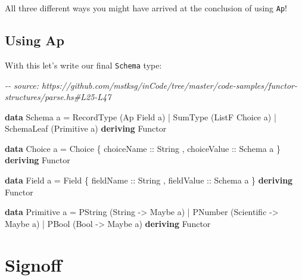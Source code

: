 \documentclass[]{article}
\newenvironment{Shaded}{}{}
\newcommand{\CommentTok}[1]{\textcolor[rgb]{0.38,0.63,0.69}{\textit{#1}}}
\newcommand{\DataTypeTok}[1]{\textcolor[rgb]{0.56,0.13,0.00}{#1}}
\newcommand{\KeywordTok}[1]{\textcolor[rgb]{0.00,0.44,0.13}{\textbf{#1}}}
\newcommand{\NormalTok}[1]{#1}
\newcommand{\OperatorTok}[1]{\textcolor[rgb]{0.40,0.40,0.40}{#1}}
\newcommand{\OtherTok}[1]{\textcolor[rgb]{0.00,0.44,0.13}{#1}}
\begin{document}
All three different ways you might have arrived at the conclusion of using
\texttt{Ap}!

\hypertarget{using-ap}{%
\subsection{Using Ap}\label{using-ap}}

With this let's write our final \texttt{Schema} type:

\begin{Shaded}
\begin{Highlighting}[]
\CommentTok{{-}{-} source: https://github.com/mstksg/inCode/tree/master/code{-}samples/functor{-}structures/parse.hs\#L25{-}L47}

\KeywordTok{data} \DataTypeTok{Schema}\NormalTok{ a }\OtherTok{=}
      \DataTypeTok{RecordType}\NormalTok{  (}\DataTypeTok{Ap} \DataTypeTok{Field}\NormalTok{ a)}
    \OperatorTok{|} \DataTypeTok{SumType}\NormalTok{     (}\DataTypeTok{ListF} \DataTypeTok{Choice}\NormalTok{ a)}
    \OperatorTok{|} \DataTypeTok{SchemaLeaf}\NormalTok{  (}\DataTypeTok{Primitive}\NormalTok{ a)}
  \KeywordTok{deriving} \DataTypeTok{Functor}

\KeywordTok{data} \DataTypeTok{Choice}\NormalTok{ a }\OtherTok{=} \DataTypeTok{Choice}
\NormalTok{    \{}\OtherTok{ choiceName  ::} \DataTypeTok{String}
\NormalTok{    ,}\OtherTok{ choiceValue ::} \DataTypeTok{Schema}\NormalTok{ a}
\NormalTok{    \}}
  \KeywordTok{deriving} \DataTypeTok{Functor}

\KeywordTok{data} \DataTypeTok{Field}\NormalTok{ a }\OtherTok{=} \DataTypeTok{Field}
\NormalTok{    \{}\OtherTok{ fieldName  ::} \DataTypeTok{String}
\NormalTok{    ,}\OtherTok{ fieldValue ::} \DataTypeTok{Schema}\NormalTok{ a}
\NormalTok{    \}}
  \KeywordTok{deriving} \DataTypeTok{Functor}

\KeywordTok{data} \DataTypeTok{Primitive}\NormalTok{ a }\OtherTok{=}
      \DataTypeTok{PString}\NormalTok{ (}\DataTypeTok{String} \OtherTok{{-}>} \DataTypeTok{Maybe}\NormalTok{ a)}
    \OperatorTok{|} \DataTypeTok{PNumber}\NormalTok{ (}\DataTypeTok{Scientific} \OtherTok{{-}>} \DataTypeTok{Maybe}\NormalTok{ a)}
    \OperatorTok{|} \DataTypeTok{PBool}\NormalTok{   (}\DataTypeTok{Bool} \OtherTok{{-}>} \DataTypeTok{Maybe}\NormalTok{ a)}
  \KeywordTok{deriving} \DataTypeTok{Functor}
\end{Highlighting}
\end{Shaded}

\hypertarget{signoff}{%
\section{Signoff}\label{signoff}}
\end{document}
